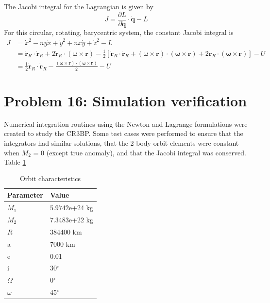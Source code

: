 \documentclass[]{aiaa-tc}%
\begin{document}
The Jacobi integral for the Lagrangian is given by
\begin{equation}
J=\frac{\partial L}{\partial \mathbf{\dot{q}}}\cdot \mathbf{\dot{q}}-L
\label{eqn:Jacobi}
\end{equation}
For this circular, rotating, barycentric system, the constant Jacobi integral is 
\begin{equation}
\begin{aligned}
J &= \dot{x}^2-ny\dot{x}+\dot{y}^2+nx\dot{y}+\dot{z}^2 -L\\ 
 &= \mathbf{\dot{r}}_R \cdot \mathbf{\dot{r}}_R+2\mathbf{\dot{r}}_R\cdot(\boldsymbol{\omega }\times \mathbf{r}) - \frac{1}{2}\left [ \mathbf{\dot{r}}_R\cdot \mathbf{\dot{r}}_R + \left ( \boldsymbol{\omega} \times \mathbf{r} \right ) \cdot \left ( \boldsymbol{\omega} \times \mathbf{r} \right ) +2\mathbf{\dot{r}}_R \cdot \left (  \boldsymbol{\omega} \times \mathbf{r} \right )\right ] -U\\
 &= \frac{1}{2}\mathbf{\dot{r}}_R \cdot \mathbf{\dot{r}}_R- \frac{\left ( \boldsymbol{\omega} \times \mathbf{r} \right ) \cdot \left ( \boldsymbol{\omega} \times \mathbf{r} \right )}{2}  -U
\end{aligned}
\end{equation}

	\section{Problem 16: Simulation verification}	
Numerical integration routines using the Newton and Lagrange formulations were created to study the CR3BP. Some test cases were performed to ensure that the integrators had similar solutions, that the 2-body orbit elements were constant when $M_2$ = 0 (except true anomaly), and that the Jacobi integral was conserved. Table \ref{tbl:OrbitCharacteristics}
\begin{table}[H]
\centering
\caption{Orbit characteristics}
\label{tbl:OrbitCharacteristics}
\begin{tabular}{|l|l|}
\hline
\rowcolor[HTML]{C0C0C0} 
\textbf{Parameter} & \textbf{Value} \\ \hline
$M_1$                  &  5.9742e+24 kg             \\ \hline
$M_2$                  &  7.3483e+22 kg             \\ \hline
$R$                  &  384400 km             \\ \hline
a                  & 7000 km             \\ \hline
e                  & 0.01           \\ \hline
i                  & 30$^\circ$     \\ \hline
$\Omega$           & 0$^\circ$                \\ \hline
$\omega$           & 45$^\circ$               \\ \hline
\end{tabular}
\end{table}
\end{document}
